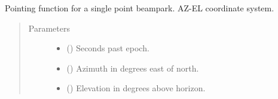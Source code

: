 \documentclass[letterpaper,10pt,english]{sphinxmanual}
\begin{document}
\begin{fulllineitems}
\label{\detokenize{modules/radar_scan_library:radar_scan_library.ns_fence_model}}
\end{fulllineitems}


\begin{fulllineitems}
\label{\detokenize{modules/radar_scan_library:radar_scan_library.ns_fence_rng_model}}
\end{fulllineitems}


\begin{fulllineitems}
\label{\detokenize{modules/radar_scan_library:radar_scan_library.point_beampark}}
Pointing function for a single point beampark. AZ-EL coordinate system.
\begin{quote}\begin{description}
\item[{Parameters}] \leavevmode\begin{itemize}
\item {} 
 () \textendash{} Seconds past epoch.

\item {} 
 () \textendash{} Azimuth in degrees east of north.

\item {} 
 () \textendash{} Elevation in degrees above horizon.

\end{itemize}

\end{description}\end{quote}

\end{fulllineitems}
\end{document}
